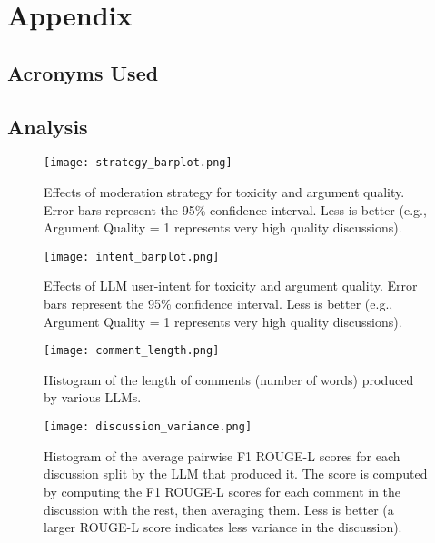 \section{Appendix}
\subsection{Acronyms Used}

\begin{acronym}[WWW] %
\end{acronym}


\subsection{Analysis}
\label{ssec:appendix:analysis}


\begin{figure}[H]
	\centering
	\texttt{[image: strategy\_barplot.png]}
	\caption{Effects of moderation strategy for toxicity and argument quality. Error bars represent the 95\% confidence interval. Less is better (e.g., Argument Quality = 1 represents very high quality discussions).}
	\label{fig::strategy_barplot}
\end{figure}

\begin{figure}[H]
	\centering
	\texttt{[image: intent\_barplot.png]}
	\caption{Effects of LLM user-intent for toxicity and argument quality. Error bars represent the 95\% confidence interval. Less is better (e.g., Argument Quality = 1 represents very high quality discussions).}
	\label{fig::intent_barplot}
\end{figure}

\begin{figure}[H]
	\centering
	\texttt{[image: comment\_length.png]}
	\caption{Histogram of the length of comments (number of words) produced by various \acp{LLM}.}
	\label{fig::comment_length}
\end{figure}

\begin{figure}[H]
	\centering
	\texttt{[image: discussion\_variance.png]}
	\caption{Histogram of the average pairwise F1 ROUGE-L \cite{lin-2004-rouge} scores for each discussion split by the \ac{LLM} that produced it. The score is computed by computing the F1 ROUGE-L scores for each comment in the discussion with the rest, then averaging them. Less is better (a larger ROUGE-L score indicates less variance in the discussion).}
	\label{fig::discussion_variance}
\end{figure}

